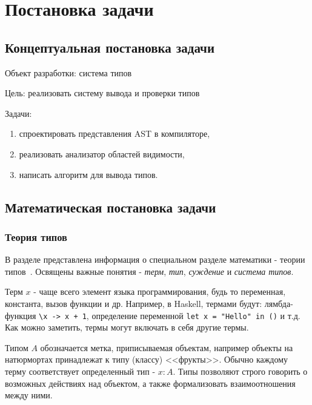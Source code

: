 \chapter{Постановка задачи}
\label{ch:task}

\section{Концептуальная постановка задачи}
\label{sec:abstract_task}

Объект разработки: система типов

Цель: реализовать систему вывода и проверки типов

Задачи:
\begin{enumerate}[1)]
    \item спроектировать представления AST в компиляторе,
    \item реализовать анализатор областей видимости,
    \item написать алгоритм для вывода типов.
\end{enumerate}


\section{Математическая постановка задачи}
\label{sec:math_task}

\subsection{Теория типов}
\label{subsec:type_theory}

В разделе представлена информация о специальном разделе математики - теории типов~\cite{TypeTheoryBook}.
Освящены важные понятия - \textit{терм}, \textit{тип}, \textit{суждение} и \textit{система типов}.

Терм $x$ - чаще всего элемент языка программирования, будь то переменная, константа, вызов функции и др.
Например, в Haskell, термами будут: лямбда-функция \lstinline{\x -> x + 1}, определение переменной \lstinline{let x = "Hello" in ()} и т.д.
Как можно заметить, термы могут включать в себя другие термы.

Типом $A$ обозначается метка, приписываемая объектам, например объекты на натюрмортах принадлежат к типу (классу) <<фрукты>>.
Обычно каждому терму соответствует определенный тип - $x: A$.
Типы позволяют строго говорить о возможных действиях над объектом, а также формализовать взаимоотношения между ними.

